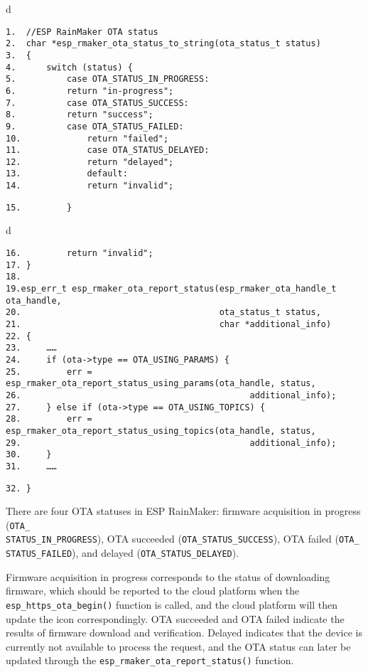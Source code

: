 \documentclass[a4paper,12pt]{book}
\begin{document}
\begin{codebloc}
\begin{tabular}{d}
\vspace{2pt}
\begin{verbatim}
1.  //ESP RainMaker OTA status
2.  char *esp_rmaker_ota_status_to_string(ota_status_t status)
3.  {
4.      switch (status) {
5.          case OTA_STATUS_IN_PROGRESS:
6.          return "in-progress";
7.          case OTA_STATUS_SUCCESS:
8.          return "success";
9.          case OTA_STATUS_FAILED:
10.             return "failed";
11.             case OTA_STATUS_DELAYED:
12.             return "delayed";
13.             default:
14.             return "invalid";
\end{verbatim}
\verb|15.         }|
\end{tabular}
\end{codebloc}

\begin{codebloc}
\begin{tabular}{d}
\vspace{2pt}
\begin{verbatim}
16.         return "invalid";
17. }
18.
19.esp_err_t esp_rmaker_ota_report_status(esp_rmaker_ota_handle_t ota_handle,
20.                                       ota_status_t status,
21.                                       char *additional_info)
22. {
23.     ……
24.     if (ota->type == OTA_USING_PARAMS) {
25.         err = esp_rmaker_ota_report_status_using_params(ota_handle, status,
26.                                             additional_info);
27.     } else if (ota->type == OTA_USING_TOPICS) {
28.         err = esp_rmaker_ota_report_status_using_topics(ota_handle, status,
29.                                             additional_info);
30.     }
31.     ……
\end{verbatim}
\verb|32. }|
\end{tabular}
\end{codebloc}

There are four OTA statuses in ESP RainMaker: firmware acquisition in progress (\verb|OTA_|\\ \verb|STATUS_IN_PROGRESS|), OTA succeeded (\verb|OTA_STATUS_SUCCESS|), OTA failed (\verb|OTA_|\\ \verb|STATUS_FAILED|), and delayed (\verb|OTA_STATUS_DELAYED|).

Firmware acquisition in progress corresponds to the status of downloading firmware, which should be reported to the cloud platform when the \verb|esp_https_ota_begin()| function is called, and the cloud platform will then update the icon correspondingly. OTA succeeded and OTA failed indicate the results of firmware download and verification. Delayed indicates that the device is currently not available to process the request, and the OTA status can later be updated through the \verb|esp_rmaker_ota_report_status()| function.
\end{document}
